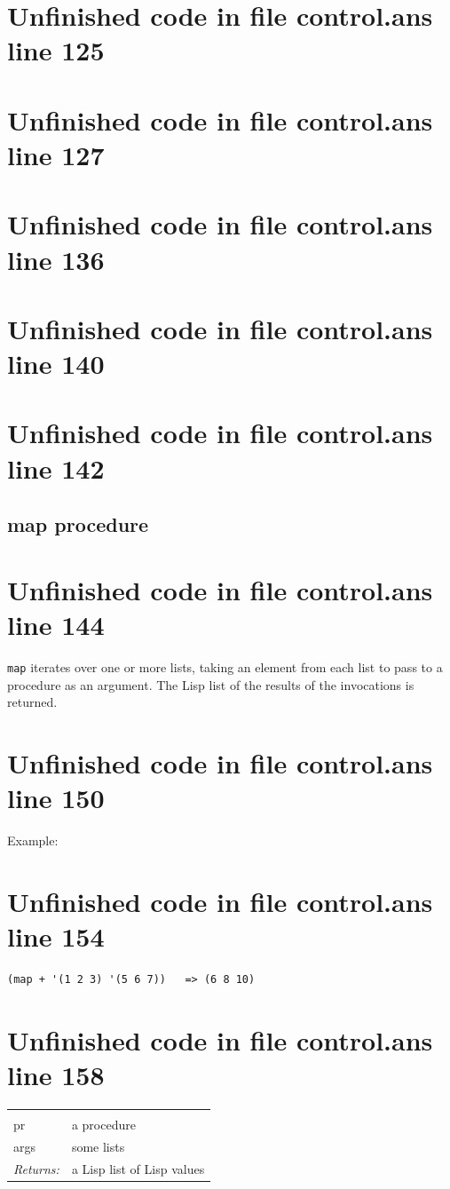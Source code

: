 \documentclass[twoside,9pt]{report}
\begin{document}
\section{Unfinished code in file control.ans line 125}
\section{Unfinished code in file control.ans line 127}
\section{Unfinished code in file control.ans line 136}
\section{Unfinished code in file control.ans line 140}
\section{Unfinished code in file control.ans line 142}
\subsection{map procedure}
\label{map-procedure}
\section{Unfinished code in file control.ans line 144}


\texttt{map} iterates over one or more lists, taking an element from each list to pass to a procedure as an argument. The Lisp list of the results of the invocations is returned.

\section{Unfinished code in file control.ans line 150}


Example:

\section{Unfinished code in file control.ans line 154}
\begin{verbatim}
(map + '(1 2 3) '(5 6 7))   => (6 8 10)
\end{verbatim}
\section{Unfinished code in file control.ans line 158}
\noindent\begin{tabular}{ |p{1.9cm} p{8cm}| }
\hline
\rowcolor[HTML]{CCCCCC} \multicolumn{2}{|l|}{\bf map (public)} \\
pr & a procedure \\
args & some lists \\
\textit{Returns:} & a Lisp list of Lisp values \\
\hline
\end{tabular}
\end{document}
